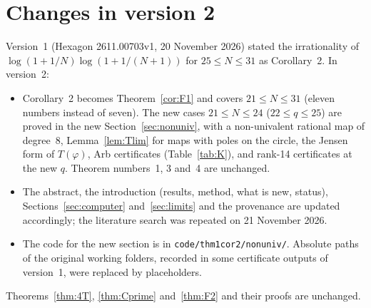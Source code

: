 \documentclass[11pt]{amsart}
\theoremstyle{definition}
\theoremstyle{remark}
\numberwithin{equation}{section}
\newcommand{\file}[1]{{\def\_{\textunderscore\allowbreak}\texttt{#1}}}
\begin{document}
\section*{Changes in version 2}
Version~1 (Hexagon 2611.00703v1, 20 November 2026) stated the irrationality of $\log(1+1/N)\log(1+1/(N+1))$ for
$25\le N\le31$ as Corollary~2. In version~2:
\begin{itemize}
\item Corollary~2 becomes Theorem~\ref{cor:F1} and covers $21\le N\le31$ (eleven numbers instead of seven). The new
cases $21\le N\le24$ ($22\le q\le25$) are proved in the new Section~\ref{sec:nonuniv}, with a non-univalent rational map
of degree~$8$, Lemma~\ref{lem:Tlim} for maps with poles on the circle, the Jensen form of $T(\varphi)$, Arb certificates
(Table~\ref{tab:K}), and rank-14 certificates at the new $q$. Theorem numbers~1, 3 and~4 are unchanged.
\item The abstract, the introduction (results, method, what is new, status), Sections~\ref{sec:computer}
and~\ref{sec:limits} and the provenance are updated accordingly; the literature search was repeated on 21 November 2026.
\item The code for the new section is in \file{code/thm1\_cor2/nonuniv/}. Absolute paths of the original working
folders, recorded in some certificate outputs of version~1, were replaced by placeholders.
\end{itemize}
Theorems~\ref{thm:4T}, \ref{thm:Cprime} and~\ref{thm:F2} and their proofs are unchanged.



\end{document}
